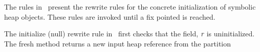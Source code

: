 The rules in~ present the rewrite rules for the
concrete initialization of symbolic heap objects.  These rules are
invoked until a fix pointed is reached. 

The initialize (null) rewrite rule in~ first
checks that the field, $\emph{r}$ is uninitialized. The fresh method
returns a new input heap reference from the partition 



